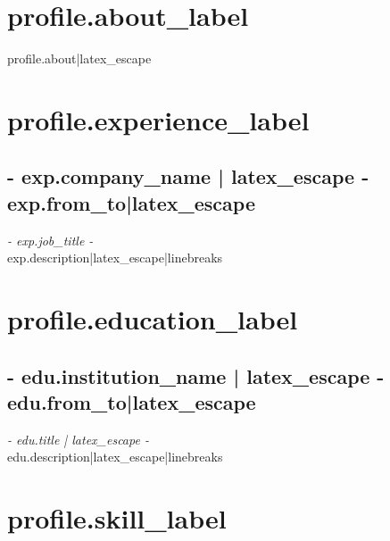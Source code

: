 \documentclass[a4paper, {{- app.cv.latex_pt -}}pt]{report}
\begin{document}
{{{%
\space
\section*{ {{ profile.about_label }} }
{{ profile.about|latex_escape }}
{%


{%
\section*{ {{ profile.experience_label }} }
{%
\subsection*{ {{- exp.company_name | latex_escape -}} \hfill {{ exp.from_to|latex_escape }}  }
\textit{ {{- exp.job_title -}} } \vspace{3mm} \\
{{ exp.description|latex_escape|linebreaks }}
{%
{%

{%
\section*{ {{ profile.education_label }}}
{%
\subsection*{ {{- edu.institution_name | latex_escape -}} \hfill {{ edu.from_to|latex_escape }} }
\textit{ {{- edu.title | latex_escape -}} } \vspace{3mm} \\
{{ edu.description|latex_escape|linebreaks }}
{%
{%

{%
\section*{ {{ profile.skill_label }}}
\begin{center}
\end{center}
{%

}}}}}}}}}}}}}}
\end{document}
